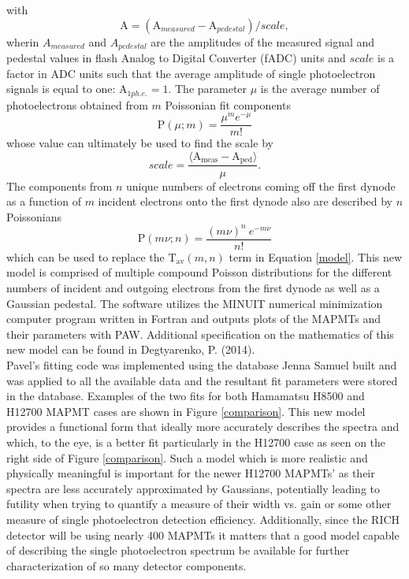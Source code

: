 \documentclass[prc,twocolumn]{revtex4}
\begin{document}
		with $$\mathrm{A} = (\mathrm{A}_{measured} - \mathrm{A}_{pedestal})/scale,$$
		wherin $A_{measured}$ and $A_{pedestal}$ are the amplitudes of the measured signal and pedestal values in flash Analog to Digital Converter (fADC) units and $scale$ is a factor in ADC units such that the average amplitude of single photoelectron signals is equal to one: $\mathrm{A}_{1 ph.e.} = 1 $.  The parameter $\mu$ is the average number of photoelectrons obtained from  $m$ Poissonian fit components $$\mathrm{P}(\mu;m) = \frac{\mu^{m} e^{-\mu}}{m!}$$ whose value can ultimately be used to find the scale by 
		$$ scale = \frac{ \langle \mathrm{A}_{\mathrm{meas}} - \mathrm{A}_{\mathrm{ped}} \rangle}{\mu}. $$
		\indent The components from $n$ unique numbers of electrons coming off the first dynode as a function of $m$ incident electrons onto the first dynode also are described by $n$ Poissonians
		$$\mathrm{P}(m \nu;n) = \frac{(m \nu)^{n}\  e^{-m \nu }}{n!}$$
		which can be used to replace the $\mathrm{T}_{\mathrm{av}}(m,n)$ term in Equation \ref{model}.  This new model is comprised of multiple compound Poisson distributions for the different numbers of incident and outgoing electrons from the first dynode as well as a Gaussian pedestal.  The software utilizes the MINUIT numerical minimization computer program written in Fortran and outputs plots of the MAPMTs and their parameters with PAW.  Additional specification on the mathematics of this new model can be found in Degtyarenko, P. (2014). \cite{pavel}
		\\
		\indent Pavel's fitting code was implemented using the database Jenna Samuel built and was applied to all the available data and the resultant fit parameters were stored in the database.  Examples of the two fits for both Hamamatsu H8500 and H12700 MAPMT cases are shown in Figure \ref{comparison}.  This new model provides a functional form that ideally more accurately describes the spectra and which, to the eye, is a better fit particularly in the H12700 case as seen on the right side of Figure \ref{comparison}.  Such a model which is more realistic and physically meaningful is important for the newer H12700 MAPMTs' as their spectra are less accurately approximated by Gaussians, potentially leading to futility when trying to quantify a measure of their width vs. gain or some other measure of single photoelectron detection efficiency.  Additionally, since the RICH detector will be using nearly 400 MAPMTs it matters that a good model capable of describing the single photoelectron spectrum be available for further characterization of so many detector components. 
	
\end{document}
